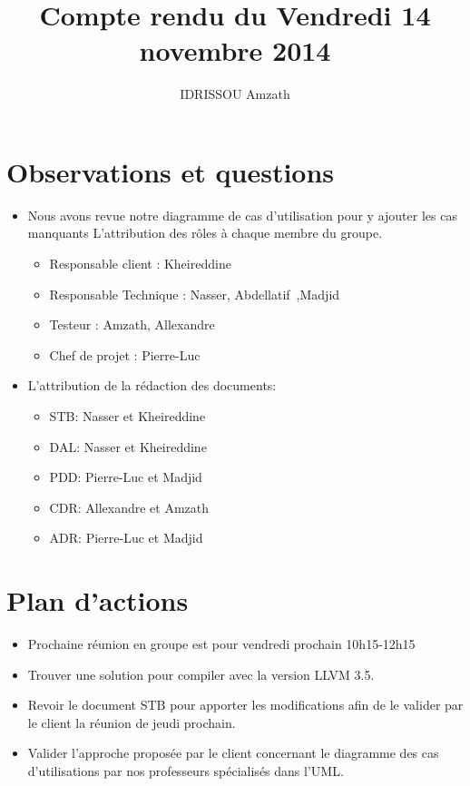 \documentclass{../../../../../res/rapport}
\author{IDRISSOU Amzath}
\title{Compte rendu du Vendredi 14 novembre 2014}
\begin{document}
    \maketitle
    \tableofcontents
    \clearpage
    
    \section{Observations et questions} 
    \label{sec:observations_et_questions}
        \begin{itemize}
            \item Nous avons revue notre diagramme de cas d’utilisation pour y 
                ajouter les cas manquants L’attribution des rôles à chaque
                membre du groupe.\\

                \begin{itemize}
                    \item Responsable client : Kheireddine
                    \item Responsable Technique : Nasser, Abdellatif ,Madjid
                    \item Testeur : Amzath, Allexandre
                    \item Chef de projet : Pierre-Luc  
                \end{itemize}
            \item  L’attribution de la rédaction des documents:
                \begin{itemize}
                    \item STB: Nasser et Kheireddine
                    \item DAL: Nasser et Kheireddine
                    \item PDD: Pierre-Luc et Madjid
                    \item CDR: Allexandre et Amzath 
                    \item ADR: Pierre-Luc et Madjid        
                \end{itemize}
            
        \end{itemize}
        
    \section{Plan d'actions} 
    \label{sec:plan_d_actions}
        \begin{itemize}
            \item Prochaine réunion en groupe est pour vendredi prochain
                10h15-12h15
            \item Trouver une solution pour compiler avec la version LLVM 3.5. 
            \item Revoir le document STB pour apporter les modifications afin
                de le valider par le client la réunion de jeudi prochain.
            \item Valider l’approche proposée par le client concernant le 
                diagramme des cas d’utilisations par nos professeurs spécialisés
                dans l’UML.
        \end{itemize}
        
\end{document}
